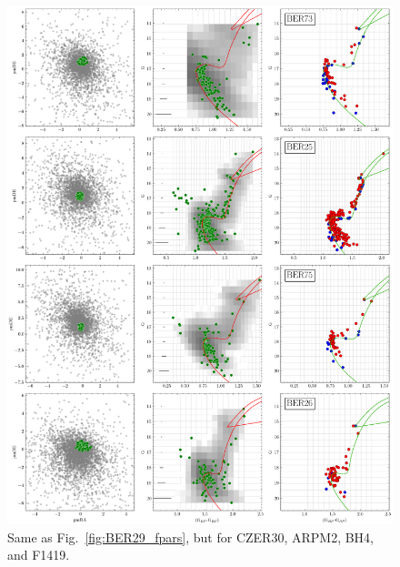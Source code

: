 \documentclass{aa}
\begin{document}
\begin{appendix}
 \begin{figure}
  \centering
  \includegraphics[height=.95\textheight]{figs/0_fpars.png}
  \caption{Same as Fig.~\ref{fig:BER29_fpars}, but  for CZER30, ARPM2, BH4, and F1419.}
  \label{fig:8fpars}
 \end{figure}


\end{appendix}
\end{document}
